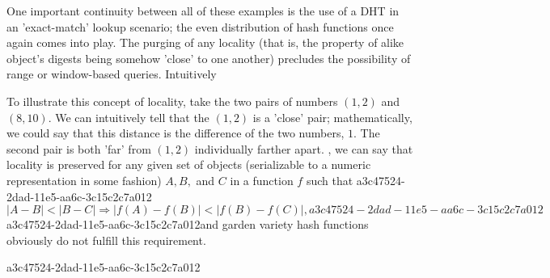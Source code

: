 \documentclass[12pt]{article}
\begin{document}
\par One important continuity between all of these examples is the use of a DHT in an 'exact-match' lookup scenario; the even distribution of hash functions once again comes into play. The purging of any locality (that is, the property of alike object's digests being somehow 'close' to one another) precludes the possibility of range or window-based queries. Intuitively

\par To illustrate this concept of locality, take the two pairs of numbers $(1,2)$ and $(8,10)$. We can intuitively tell that the $(1,2)$ is a 'close' pair; mathematically, we could say that this distance is the difference of the two numbers, $1$. The second pair is both 'far' from $(1,2)$ individually farther apart. , we can say that locality is preserved for any given set of objects (serializable to a numeric representation in some fashion) $A,B,$ and $C$ in a function $f$ such that
a3c47524-2dad-11e5-aa6c-3c15c2c7a012\begin{equation}
|A-B| < |B-C| \Rightarrow |f(A)-f(B)| < |f(B) - f(C)|,
a3c47524-2dad-11e5-aa6c-3c15c2c7a012\end{equation}
a3c47524-2dad-11e5-aa6c-3c15c2c7a012and garden variety hash functions obviously do not fulfill this requirement.

a3c47524-2dad-11e5-aa6c-3c15c2c7a012\printbibliography
\end{document}
